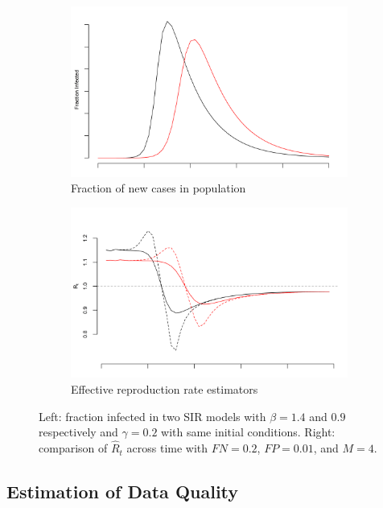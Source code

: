 \documentclass[aoas]{amsart}
\begin{document}
\begin{figure}
\centering
\begin{subfigure}{.5\textwidth}
  \centering
  \includegraphics[width=.9\linewidth]{../methods/figs/sir.png}
  \caption{Fraction of new cases in population}
  \label{fig:sub1}
\end{subfigure}%
\begin{subfigure}{.5\textwidth}
  \centering
  \includegraphics[width=.9\linewidth]{../methods/figs/sir_rt_comparison.png}
  \caption{Effective reproduction rate estimators}
  \label{fig:sub2}
\end{subfigure}
\caption{Left: fraction infected in two SIR models with $\beta = 1.4$ and $0.9$ respectively and $\gamma = 0.2$ with same initial conditions. Right: comparison of $\hat R_t$ across time with $FN = 0.2$, $FP = 0.01$, and $M = 4$.}
\label{fig:test}
\end{figure}

\subsection{Estimation of Data Quality}
\end{document}
